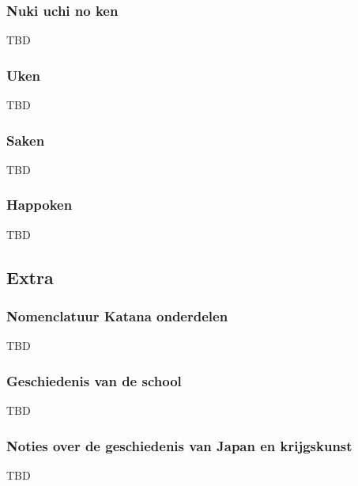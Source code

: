 \subsubsection{Nuki uchi no ken}

\suwaristart
TBD

\subsubsection{Uken}

\suwaristart
TBD

\subsubsection{Saken}

\suwaristart
TBD

\subsubsection{Happoken}

TBD

\subsection{Extra}

\subsubsection{Nomenclatuur Katana onderdelen}

TBD

\subsubsection{Geschiedenis van de school}

TBD

\subsubsection{Noties over de geschiedenis van Japan en krijgskunst}

TBD
